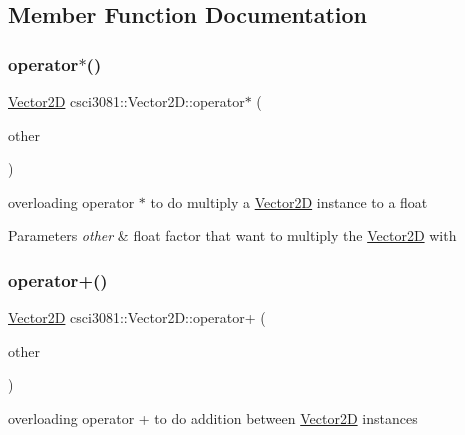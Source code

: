 \subsection{Member Function Documentation}
\mbox{\label{classcsci3081_1_1Vector2D_a73ad5eb3819cfc93eba7d542abf54acf}} 
\subsubsection{\texorpdfstring{operator$\ast$()}{operator*()}}
{\footnotesize\ttfamily \hyperlink{classcsci3081_1_1Vector2D}{Vector2D} csci3081\+::\+Vector2\+D\+::operator$\ast$ (\begin{DoxyParamCaption}\item[{float}]{other }\end{DoxyParamCaption})}



overloading operator $\ast$ to do multiply a \hyperlink{classcsci3081_1_1Vector2D}{Vector2D} instance to a float 


\begin{DoxyParams}{Parameters}
{\em other} & float factor that want to multiply the \hyperlink{classcsci3081_1_1Vector2D}{Vector2D} with \\
\hline
\end{DoxyParams}
\mbox{\label{classcsci3081_1_1Vector2D_a7431773929a3d0c18ab926eae0e4bc28}} 
\subsubsection{\texorpdfstring{operator+()}{operator+()}}
{\footnotesize\ttfamily \hyperlink{classcsci3081_1_1Vector2D}{Vector2D} csci3081\+::\+Vector2\+D\+::operator+ (\begin{DoxyParamCaption}\item[{const \hyperlink{classcsci3081_1_1Vector2D}{Vector2D} \&}]{other }\end{DoxyParamCaption})}



overloading operator + to do addition between \hyperlink{classcsci3081_1_1Vector2D}{Vector2D} instances 


